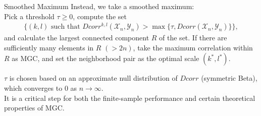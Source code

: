 \documentclass[mathserif,t]{beamer}
\newcommand{\Mgc}{MGC}
\begin{document}
\begin{frame}{Smoothed Maximum}
\pause
Instead, we take a smoothed maximum: \\
\pause
Pick a threshold $\tau \geq 0$, compute the set
\begin{align*}
\{(k,l) \mbox{ such that } Dcorr^{k,l}(\mathcal{X}_{n},\mathcal{Y}_{n})>\max\{\tau, Dcorr(\mathcal{X}_{n},\mathcal{Y}_{n})\} \},
\end{align*}
\pause
and calculate the largest connected component $R$ of the set.
\pause
If there are sufficiently many elements in $R$ $(>2n)$, take the maximum correlation within $R$ as \Mgc, 
\pause
and set the neighborhood pair as the optimal scale $(k^*,l^*)$.

\pause
\medskip
$\tau$ is chosen based on an approximate null distribution of $Dcorr$ (symmetric Beta), which converges to $0$ as $n \rightarrow \infty$. \\
\pause
\medskip
It is a critical step for both the finite-sample performance and certain theoretical properties of \Mgc.
\end{frame}
\end{document}
